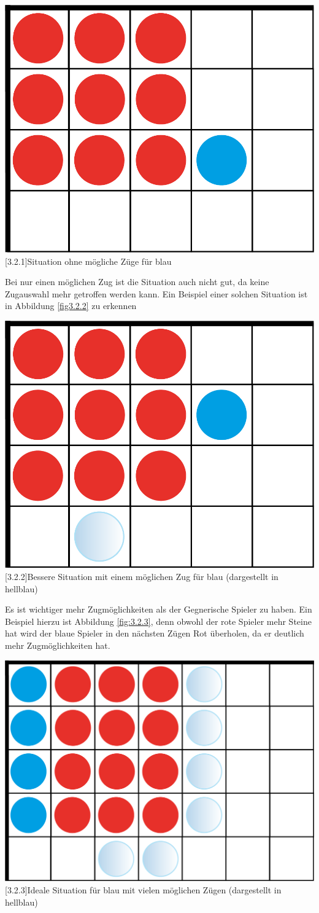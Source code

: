 \documentclass[12pt,a4paper,bibliography=totocnumbered,listof=totocnumbered]{scrartcl}
\begin{document}
    
    
    \vspace{1em}
    \begin{minipage}{\linewidth}
    	\centering
    	\includegraphics[width=0.33\linewidth]{pics/Kapitel_3/Kapitel_3_pic5.png}
    	[3.2.1]{Situation ohne mögliche Züge für blau}
    	\label{fig:3.2.1}
    \end{minipage}
    \vspace{1em}
    
    
    Bei nur einen möglichen Zug ist die Situation auch nicht gut, da keine Zugauswahl mehr getroffen werden kann. Ein Beispiel einer solchen Situation ist in Abbildung \ref{fig3.2.2} zu erkennen
    
    \vspace{1em}
    \begin{minipage}{\linewidth}
    	\centering
    	\includegraphics[width=0.33\linewidth]{pics/Kapitel_3/Kapitel_3_pic6.png}
    	[3.2.2]{Bessere Situation mit einem möglichen Zug für blau (dargestellt in hellblau)}
    	\label{fig:3.2.2}
    \end{minipage}
    \vspace{1em}
    
    
    Es ist wichtiger mehr Zugmöglichkeiten als der Gegnerische Spieler zu haben. Ein Beispiel hierzu ist Abbildung \ref{fig:3.2.3}, denn obwohl der rote Spieler mehr Steine hat wird der blaue Spieler in den nächsten Zügen Rot überholen, da er deutlich mehr Zugmöglichkeiten hat.
    
    
    \vspace{1em}
    \begin{minipage}{\linewidth}
    	\centering
    	\includegraphics[width=0.33\linewidth]{pics/Kapitel_3/Kapitel_3_pic7.png}
    	[3.2.3]{Ideale Situation für blau mit vielen möglichen Zügen (dargestellt in hellblau)}
    	\label{fig:3.2.3}
    \end{minipage}
    \vspace{1em}
    
\end{document}
